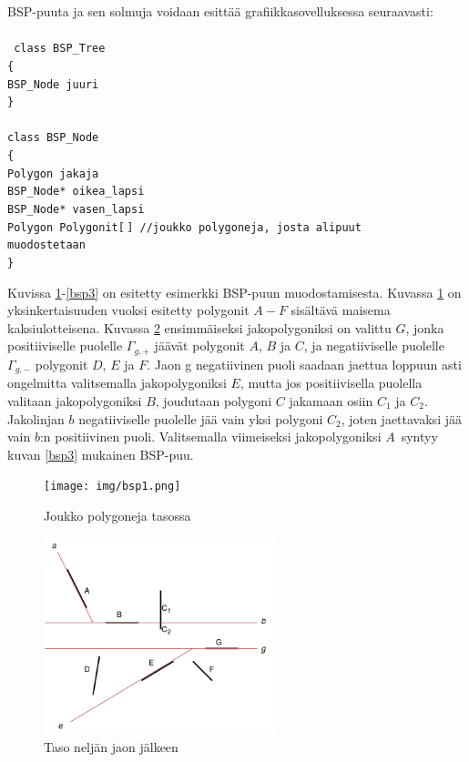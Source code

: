 \documentclass[a4paper,12pt, titlepage]{article}
\newcommand{\tab}[1][0.5cm]{\hspace*{#1}} %
\newcommand{\code}[1]{\small\texttt{#1}} %
\begin{document}
BSP-puuta ja sen solmuja voidaan esittää grafiikkasovelluksessa seuraavasti:\\\\%
\code{
class BSP\_Tree\\
\{\\
\tab BSP\_Node juuri\\
\}\\\\
class BSP\_Node\\
\{\\
\tab Polygon jakaja\\
\tab BSP\_Node* oikea\_lapsi\\
\tab BSP\_Node* vasen\_lapsi\\
\tab Polygon Polygonit[$\,$] \tab //joukko polygoneja, josta alipuut\\ 
\hspace*{5.65cm} muodostetaan\\
\}\\}



\newpage
Kuvissa \ref{bsp1}-\ref{bsp3} on esitetty esimerkki BSP-puun muodostamisesta. Kuvassa \ref{bsp1} on yksinkertaisuuden vuoksi esitetty polygonit $A-F$ sisältävä maisema kaksiulotteisena. Kuvassa \ref{bsp2} ensimmäiseksi jakopolygoniksi on valittu $G$, jonka positiiviselle puolelle $\Gamma_{g,+}$ jäävät polygonit $A$, $B$ ja $C$, ja negatiiviselle puolelle $\Gamma_{g,-}$ polygonit $D$, $E$ ja $F$. Jaon g negatiivinen puoli saadaan jaettua loppuun asti ongelmitta valitsemalla jakopolygoniksi $E$, mutta jos positiivisella puolella valitaan jakopolygoniksi $B$, joudutaan polygoni $C$ jakamaan osiin $C_1$ ja $C_2$. Jakolinjan $b$ negatiiviselle puolelle jää vain yksi polygoni $C_2$, joten jaettavaksi jää vain $b$:n positiivinen puoli. Valitsemalla viimeiseksi jakopolygoniksi $A$ syntyy kuvan \ref{bsp3} mukainen BSP-puu.\\

\begin{figure}
 \centering
 \texttt{[image: img/bsp1.png]}
 \vspace{0.5cm}
 \caption{Joukko polygoneja tasossa}
 \label{bsp1}
\end{figure}

\begin{figure}
 \centering
 \includegraphics[width=0.6\textwidth]{img/bsp2.png}
 \vspace{0.5cm}
 \caption{Taso neljän jaon jälkeen}
 \label{bsp2}
\end{figure}
\end{document}
